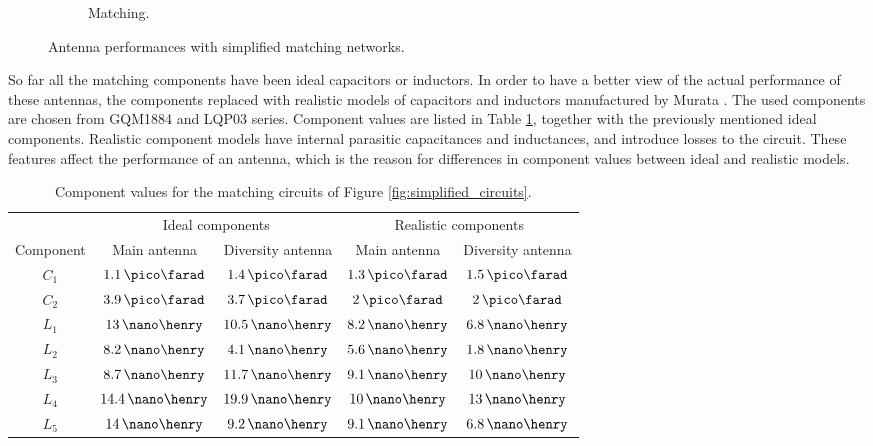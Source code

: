 \begin{figure}[H]
\begin{subfigure}[b]{0.49\textwidth}
        \caption{Matching.}
        \label{fig:div_ideal_match}
    \end{subfigure}
    \caption{Antenna performances with simplified matching networks.}
    \label{fig:div_eff}
\end{figure}

So far all the matching components have been ideal capacitors or inductors. In order to have a better view of the actual performance of these antennas, the components replaced with realistic models of capacitors and inductors manufactured by Murata \cite{murata}. The used components are chosen from GQM1884 \cite{murata_c} and LQP03 \cite{murata_l} series. Component values are listed in Table \ref{tab:match}, together with the previously mentioned ideal components. Realistic component models have internal parasitic capacitances and inductances, and introduce losses to the circuit. These features affect the performance of an antenna, which is the reason for differences in component values between ideal and realistic models.
\begin{table}[H]
    \centering
    \caption{Component values for the matching circuits of Figure \ref{fig:simplified_circuits}.}
    \label{tab:match}
    \begin{tabular}{|c|c|c|c|c|}
        \hline
         & \multicolumn{2}{|c|}{Ideal components} & \multicolumn{2}{|c|}{Realistic components} \\
         \cline{2-5}
         Component & Main antenna & Diversity antenna & Main antenna & Diversity antenna\\
         \hline
         $C_1$ & $1.1\,\pico\farad$ & $1.4\,\pico\farad$ & $1.3\,\pico\farad$ & $1.5\,\pico\farad$\\
         \hline
         $C_2$ & $3.9\,\pico\farad$ & $3.7\,\pico\farad$ & $2\,\pico\farad$ & $2\,\pico\farad$\\
         \hline
         $L_1$ & $13\,\nano\henry$ & $10.5\,\nano\henry$ & $8.2\,\nano\henry$ & $6.8\,\nano\henry$\\
         \hline
         $L_2$ & $8.2\,\nano\henry$ & $4.1\,\nano\henry$ & $5.6\,\nano\henry$ & $1.8\,\nano\henry$\\
         \hline
         $L_3$ & $8.7\,\nano\henry$ & $11.7\,\nano\henry$ & $9.1\,\nano\henry$ & $10\,\nano\henry$\\
         \hline
         $L_4$ & $14.4\,\nano\henry$ & $19.9\,\nano\henry$ & $10\,\nano\henry$ & $13\,\nano\henry$\\
         \hline
         $L_5$ & $14\,\nano\henry$ & $9.2\,\nano\henry$ & $9.1\,\nano\henry$ & $6.8\,\nano\henry$\\
         \hline
    \end{tabular}
\end{table}

